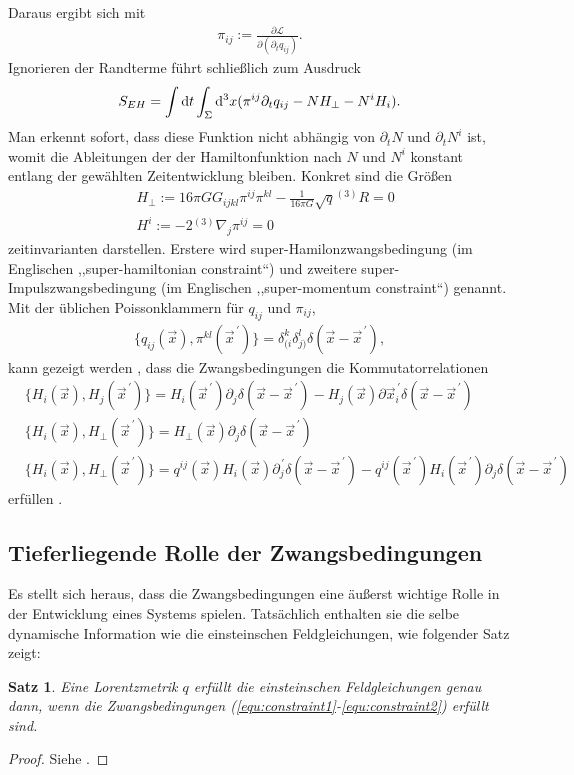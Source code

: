\documentclass{scrartcl}
\newtheorem{theorem}{Satz}
\newcommand{\inHS}{{}^{(3)}\!}
\begin{document}
		Daraus ergibt sich mit
		\begin{align}
			\pi_{ij}:=\frac{\partial \mathcal{L}}{\partial(\partial_t q_{ij})}.
		\end{align}
		Ignorieren der Randterme führt schließlich zum Ausdruck
		\begin{align}
			S_{EH}=\int{\rm d}t\int_\Sigma {\rm d}^3x (\pi^{ij}\partial_t q_{ij}-NH_{\perp}-N^i H_i).
		\end{align}
		Man erkennt sofort, dass diese Funktion nicht abhängig von $\partial_t N$ und $\partial_t N^i$
		ist, womit die Ableitungen der der Hamiltonfunktion nach $N$ und $N^i$ konstant entlang der gewählten
		Zeitentwicklung bleiben. Konkret sind die Größen
		\begin{align}
			&H_{\perp}:=16\pi G G_{ijkl}\pi^{ij}\pi^{kl}-\frac{1}{16\pi G}\sqrt{q}\inHS R=0 \label{equ:constraint1}\\
			&H^i:=-2\inHS\nabla_j\pi^{ij}=0 \label{equ:constraint2}
		\end{align}
		zeitinvarianten darstellen. Erstere wird super-Hamilonzwangsbedingung (im Englischen ,,super-hamiltonian constraint``)
		und zweitere super-Impulszwangsbedingung (im Englischen ,,super-momentum constraint``) genannt.
		Mit der üblichen Poissonklammern für $q_{ij}$ und $\pi_{ij}$,
		\begin{align}
			\{q_{ij}(\vec{x}),\pi^{kl}(\vec{x}^{\,\prime})\}=\delta^k_{(i}\delta^l_{j)}\delta(\vec{x}-\vec{x}^{\,\prime}),
		\end{align}
		kann gezeigt werden \cite{dirac2001lectures,cjm19510012}, dass die Zwangsbedingungen die Kommutatorrelationen
		\begin{align}
			&\{H_i(\vec{x}),H_j(\vec{x}^{\,\prime})\}=H_i(\vec{x}^{\,\prime})\partial_j\delta(\vec{x}-\vec{x}^{\,\prime})-H_j(\vec{x})\partial\vec{x}^{\,\prime}_i\delta(\vec{x}-\vec{x}^{\,\prime})\\
			&\{H_i(\vec{x}),H_\perp(\vec{x}^{\,\prime})\}=H_\perp(\vec{x})\partial_j\delta(\vec{x}-\vec{x}^{\,\prime})\\
			&\{H_i(\vec{x}),H_\perp(\vec{x}^{\,\prime})\}=q^{ij}(\vec{x})H_i(\vec{x})\partial^{\,\prime}_j\delta(\vec{x}-\vec{x}^{\,\prime})-q^{ij}(\vec{x}^{\,\prime})H_i(\vec{x}^{\,\prime})\partial_j\delta(\vec{x}-\vec{x}^{\,\prime})
		\end{align}
		erfüllen \cite{qg06}.
	\subsection{Tieferliegende Rolle der Zwangsbedingungen}
		Es stellt sich heraus, dass die Zwangsbedingungen eine äußerst wichtige Rolle in der
		Entwicklung eines Systems spielen. Tatsächlich enthalten sie die selbe dynamische
		Information wie die einsteinschen Feldgleichungen, wie folgender
		Satz zeigt:
		\begin{theorem}
			Eine Lorentzmetrik $q$ erf\"ullt die einsteinschen Feldgleichungen genau dann, wenn die
			Zwangsbedingungen (\ref{equ:constraint1}-\ref{equ:constraint2}) erf\"ullt sind.
		\end{theorem}
		\begin{proof}
			Siehe \cite{gr-qc/9210011}. %
		\end{proof}
\end{document}
